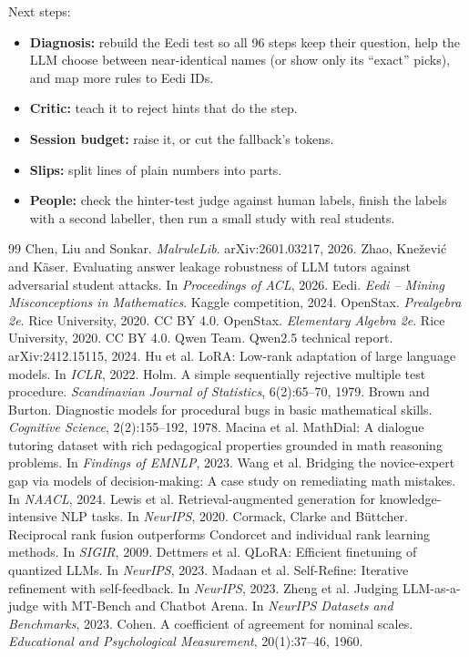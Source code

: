 \documentclass[11pt,a4paper]{article}
\begin{document}
\noindent Next steps:
\begin{itemize}
  \item \textbf{Diagnosis:} rebuild the Eedi test so all 96 steps keep their question, help the LLM choose between near-identical names (or show only its ``exact'' picks), and map more rules to Eedi IDs.
  \item \textbf{Critic:} teach it to reject hints that do the step.
  \item \textbf{Session budget:} raise it, or cut the fallback's tokens.
  \item \textbf{Slips:} split lines of plain numbers into parts.
  \item \textbf{People:} check the hinter-test judge against human labels, finish the labels with a second labeller, then run a small study with real students.
\end{itemize}


\begingroup\renewcommand{\markboth}[2]{}
\begin{thebibliography}{99}
\small
{} Chen, Liu and Sonkar. \emph{MalruleLib}. arXiv:2601.03217, 2026.
 Zhao, Kne\v{z}evi\'c and K\"aser. Evaluating answer leakage robustness of LLM tutors against adversarial student attacks. In \emph{Proceedings of ACL}, 2026.
 Eedi. \emph{Eedi -- Mining Misconceptions in Mathematics}. Kaggle competition, 2024.
 OpenStax. \emph{Prealgebra 2e}. Rice University, 2020. CC BY 4.0.
 OpenStax. \emph{Elementary Algebra 2e}. Rice University, 2020. CC BY 4.0.
 Qwen Team. Qwen2.5 technical report. arXiv:2412.15115, 2024.
 Hu et al. LoRA: Low-rank adaptation of large language models. In \emph{ICLR}, 2022.
 Holm. A simple sequentially rejective multiple test procedure. \emph{Scandinavian Journal of Statistics}, 6(2):65--70, 1979.
 Brown and Burton. Diagnostic models for procedural bugs in basic mathematical skills. \emph{Cognitive Science}, 2(2):155--192, 1978.
 Macina et al. MathDial: A dialogue tutoring dataset with rich pedagogical properties grounded in math reasoning problems. In \emph{Findings of EMNLP}, 2023.
 Wang et al. Bridging the novice-expert gap via models of decision-making: A case study on remediating math mistakes. In \emph{NAACL}, 2024.
 Lewis et al. Retrieval-augmented generation for knowledge-intensive NLP tasks. In \emph{NeurIPS}, 2020.
 Cormack, Clarke and B\"uttcher. Reciprocal rank fusion outperforms Condorcet and individual rank learning methods. In \emph{SIGIR}, 2009.
 Dettmers et al. QLoRA: Efficient finetuning of quantized LLMs. In \emph{NeurIPS}, 2023.
 Madaan et al. Self-Refine: Iterative refinement with self-feedback. In \emph{NeurIPS}, 2023.
 Zheng et al. Judging LLM-as-a-judge with MT-Bench and Chatbot Arena. In \emph{NeurIPS Datasets and Benchmarks}, 2023.
 Cohen. A coefficient of agreement for nominal scales. \emph{Educational and Psychological Measurement}, 20(1):37--46, 1960.
\end{thebibliography}
\endgroup
\end{document}
